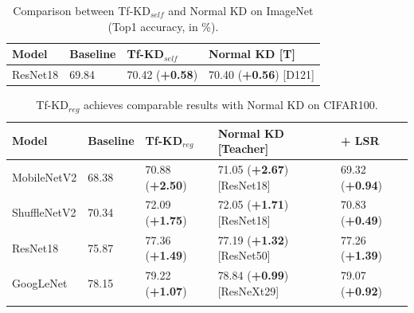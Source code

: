 \documentclass[10pt,twocolumn,letterpaper]{article}
\begin{document}
\begin{table}[!h]
\renewcommand\arraystretch{1.2}
\centering
\caption{Comparison between Tf-KD$_{self}$ and Normal KD on ImageNet (Top1 accuracy, in \%).}
\small
\begin{tabular}{llll}
\hline
Model  & Baseline & Tf-KD$_{self}$ &Normal KD [T] \\ \hline
ResNet18   &69.84 &70.42 (\textbf{+0.58}) & 70.40 (\textbf{+0.56}) [D121]\\\hline
\end{tabular}
\label{tab:imagenet_com_with_normalKD}
\vspace{-10pt}
\end{table}

\begin{table}[h]
\renewcommand\arraystretch{1.1}
\centering
\caption{Tf-KD$_{reg}$ achieves comparable results with Normal KD on CIFAR100.}
\small
\begin{tabular}{lllll}
\hline 
Model  & Baseline & Tf-KD$_{reg}$ & Normal KD [Teacher] & + LSR\\ \hline
MobileNetV2  &68.38 &70.88 (\textbf{+2.50}) &71.05 (\textbf{+2.67}) [ResNet18] &69.32 (\textbf{+0.94})\\ 
ShuffleNetV2 &70.34 &72.09 (\textbf{+1.75}) &72.05 (\textbf{+1.71}) [ResNet18] &70.83 (\textbf{+0.49})\\ 
ResNet18   &75.87 &77.36 (\textbf{+1.49})  &77.19 (\textbf{+1.32}) [ResNet50] &77.26 (\textbf{+1.39})\\
GoogLeNet  &78.15 &79.22 (\textbf{+1.07}) &78.84 (\textbf{+0.99}) [ResNeXt29] &79.07 (\textbf{+0.92})\\ 
\hline  
\label{tab:reg_CIFAR100}
\end{tabular} 
\vspace{-20pt}
\end{table}
\end{document}
